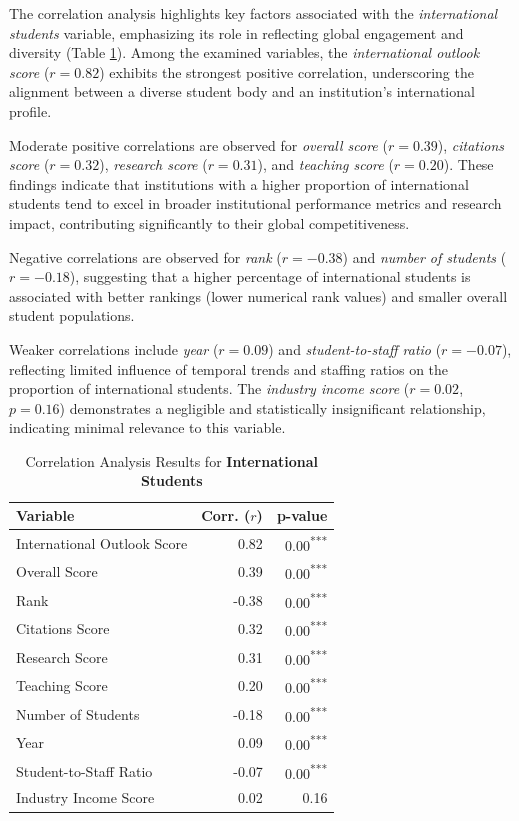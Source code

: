 \documentclass[sigconf]{acmart}
\begin{document}
The correlation analysis highlights key factors associated with the \textit{international students} variable, emphasizing its role in reflecting global engagement and diversity (Table \ref{tab:correlation_intl_students}). Among the examined variables, the \textit{international outlook score} ($r = 0.82$) exhibits the strongest positive correlation, underscoring the alignment between a diverse student body and an institution's international profile.

Moderate positive correlations are observed for \textit{overall score} ($r = 0.39$), \textit{citations score} ($r = 0.32$), \textit{research score} ($r = 0.31$), and \textit{teaching score} ($r = 0.20$). These findings indicate that institutions with a higher proportion of international students tend to excel in broader institutional performance metrics and research impact, contributing significantly to their global competitiveness.

Negative correlations are observed for \textit{rank} ($r = -0.38$) and \textit{number of students} ($r = -0.18$), suggesting that a higher percentage of international students is associated with better rankings (lower numerical rank values) and smaller overall student populations. 

Weaker correlations include \textit{year} ($r = 0.09$) and \textit{student-to-staff ratio} ($r = -0.07$), reflecting limited influence of temporal trends and staffing ratios on the proportion of international students. The \textit{industry income score} ($r = 0.02$, $p = 0.16$) demonstrates a negligible and statistically insignificant relationship, indicating minimal relevance to this variable.

\begin{table}[h!]
	\centering
	\caption{Correlation Analysis Results for \textbf{International Students}}
	\label{tab:correlation_intl_students}
	\begin{tabular}{|l|r|r|}
		\hline
		\textbf{Variable} & \textbf{Corr. ($r$)} & \textbf{p-value} \\
		\hline
		International Outlook Score & 0.82 & 0.00\textsuperscript{***} \\
		Overall Score & 0.39 & 0.00\textsuperscript{***} \\
		Rank & -0.38 & 0.00\textsuperscript{***} \\
		Citations Score & 0.32 & 0.00\textsuperscript{***} \\
		Research Score & 0.31 & 0.00\textsuperscript{***} \\
		Teaching Score & 0.20 & 0.00\textsuperscript{***} \\
		Number of Students & -0.18 & 0.00\textsuperscript{***} \\
		Year & 0.09 & 0.00\textsuperscript{***} \\
		Student-to-Staff Ratio & -0.07 & 0.00\textsuperscript{***} \\
		Industry Income Score & 0.02 & 0.16 \\
		\hline
	\end{tabular}
\end{table}
\end{document}
